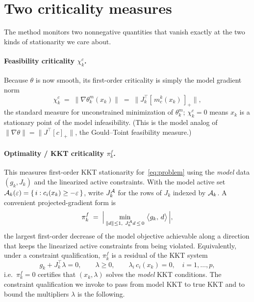 \section{Two criticality measures}
\label{sec:crit}

The method monitors two nonnegative quantities that vanish exactly at the two
kinds of stationarity we care about.

\paragraph{Feasibility criticality $\chi_k^c$.}
Because $\theta$ is now smooth, its first-order criticality is simply the model
gradient norm
\begin{equation}
  \label{eq:chi-c}
  \chi_k^c \;=\; \bigl\|\nabla\theta_k^m(x_k)\bigr\|
           \;=\; \bigl\|J_k^{\top}[\,m_c^k(x_k)\,]_+\bigr\| ,
\end{equation}
the standard measure for unconstrained minimization of $\theta_k^m$; $\chi_k^c=0$
means $x_k$ is a stationary point of the model infeasibility. (This is the model
analog of $\|\nabla\theta\|=\|J^\top[c]_+\|$, the Gould--Toint feasibility measure.)

\paragraph{Optimality / KKT criticality $\pi_k^f$.}
This measures first-order KKT stationarity for~\eqref{eq:problem} using the
\emph{model} data $(g_k,J_k)$ and the linearized active constraints. With the
model active set
$\mathcal{A}_k(\varepsilon)=\{\,i : c_i(x_k) \ge -\varepsilon\,\}$, write
$J_{k}^{\mathcal{A}}$ for the rows of $J_k$ indexed by $\mathcal{A}_k$. A convenient
projected-gradient form is
\begin{equation}
  \label{eq:pi-f}
  \pi_k^f \;=\;
  \Bigl|\, \min_{\substack{\|d\|\le 1,\ J_k^{\mathcal{A}} d\,\le\,0}}
      \ \bigl\langle g_k,\, d\bigr\rangle \,\Bigr|,
\end{equation}
the largest first-order decrease of the model objective achievable along a
direction that keeps the linearized active constraints from being violated.
Equivalently, under a constraint qualification, $\pi_k^f$ is a residual of the
KKT system
\begin{equation}
  \label{eq:kkt}
  g_k + J_k^{\top}\lambda = 0,\qquad
  \lambda\ge 0,\qquad
  \lambda_i\, c_i(x_k)=0,\quad i=1,\dots,p,
\end{equation}
i.e.\ $\pi_k^f=0$ certifies that $(x_k,\lambda)$ solves the \emph{model} KKT
conditions. The constraint qualification we invoke to pass from model KKT to true
KKT and to bound the multipliers $\lambda$ is the following.

